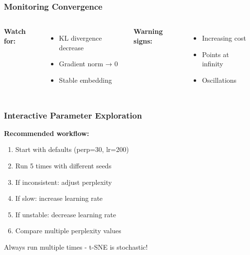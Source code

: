 \documentclass[aspectratio=169]{beamer}
\begin{document}
\begin{frame}
\frametitle{Monitoring Convergence}

\begin{columns}
\textbf{Watch for:}
\begin{itemize}
\item KL divergence decrease
\item Gradient norm → 0
\item Stable embedding
\end{itemize}

\textbf{Warning signs:}
\begin{itemize}
\item Increasing cost
\item Points at infinity
\item Oscillations
\end{itemize}

\end{columns}

\end{frame}

\begin{frame}
\frametitle{Interactive Parameter Exploration}

\begin{center}
\textbf{Recommended workflow:}
\end{center}

\begin{enumerate}
\item Start with defaults (perp=30, lr=200)
\item Run 5 times with different seeds
\item If inconsistent: adjust perplexity
\item If slow: increase learning rate
\item If unstable: decrease learning rate
\item Compare multiple perplexity values
\end{enumerate}

\vspace{0.3cm}
\colorbox{yellow!20}{Always run multiple times - t-SNE is stochastic!}

\end{frame}
\end{document}
